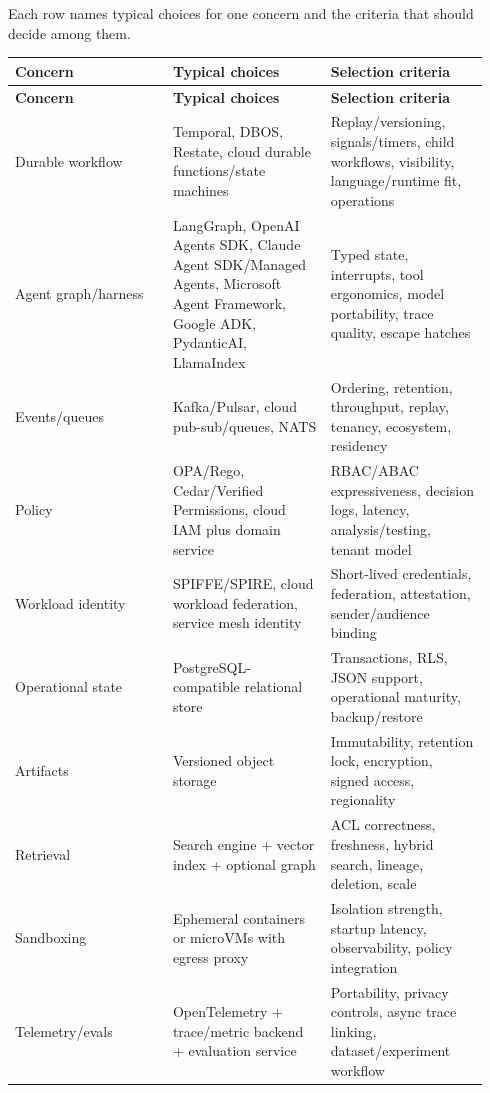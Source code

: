 Each row names typical choices for one concern and the criteria that should decide among them.\par

\BookTableStart
\small
\begin{longtable}{@{}Y{0.3133\linewidth}Y{0.3133\linewidth}Y{0.3133\linewidth}@{}}
\color{white}\bfseries \textbf{Concern} & \color{white}\bfseries \textbf{Typical choices} & \color{white}\bfseries \textbf{Selection criteria} \\
\endfirsthead
{}
\color{white}\bfseries \textbf{Concern} & \color{white}\bfseries \textbf{Typical choices} & \color{white}\bfseries \textbf{Selection criteria} \\
\endhead
Durable workflow & Temporal, DBOS, Restate, cloud durable functions/state machines & Replay/versioning, signals/timers, child workflows, visibility, language/runtime fit, operations \\
Agent graph/harness & LangGraph, OpenAI Agents SDK, Claude Agent SDK/Managed Agents, Microsoft Agent Framework, Google ADK, PydanticAI, LlamaIndex & Typed state, interrupts, tool ergonomics, model portability, trace quality, escape hatches \\
Events/queues & Kafka/Pulsar, cloud pub-sub/queues, NATS & Ordering, retention, throughput, replay, tenancy, ecosystem, residency \\
Policy & OPA/Rego, Cedar/Verified Permissions, cloud IAM plus domain service & RBAC/ABAC expressiveness, decision logs, latency, analysis/testing, tenant model \\
Workload identity & SPIFFE/SPIRE, cloud workload federation, service mesh identity & Short-lived credentials, federation, attestation, sender/audience binding \\
Operational state & PostgreSQL-compatible relational store & Transactions, RLS, JSON support, operational maturity, backup/restore \\
Artifacts & Versioned object storage & Immutability, retention lock, encryption, signed access, regionality \\
Retrieval & Search engine + vector index + optional graph & ACL correctness, freshness, hybrid search, lineage, deletion, scale \\
Sandboxing & Ephemeral containers or microVMs with egress proxy & Isolation strength, startup latency, observability, policy integration \\
Telemetry/evals & OpenTelemetry + trace/metric backend + evaluation service & Portability, privacy controls, async trace linking, dataset/experiment workflow \\
\end{longtable}
\BookTableEnd

